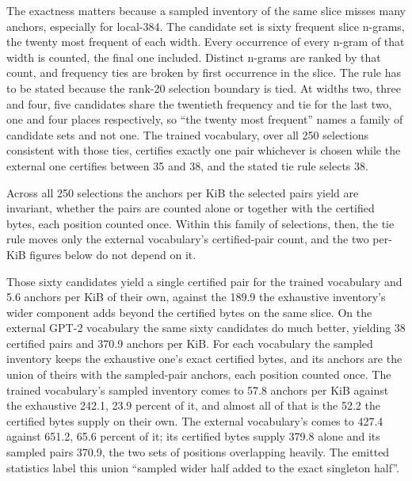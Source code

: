 \documentclass[11pt,a4paper]{article}
\theoremstyle{definition}
\theoremstyle{plain}
\newcommand{\code}[1]{\texttt{#1}}
\begin{document}
\begin{table}[!htbp]
\centering

\caption{Share of each evaluation block's ceiling supply retained by the frozen hybrid inventory, emitted by
\code{frozen\_inventory.py}. The inventory's windows of widths two to four were calibrated on the disjoint slice, and
the upper median over the sixteen blocks follows the zero-based percentile rule stated in the text.}
\label{tab:frozen}
\end{table}

The exactness matters because a sampled inventory of the same slice misses many anchors, especially for local-384. The
candidate set is sixty frequent slice n-grams, the twenty most frequent of each width. Every occurrence of every n-gram
of that width is counted, the final one included. Distinct n-grams are ranked by that count, and frequency ties are
broken by first occurrence in the slice. The rule has to be stated because the rank-20 selection boundary is tied. At
widths two, three and four, five candidates share the twentieth frequency and tie for the last two, one and four places
respectively, so ``the twenty most frequent'' names a family of candidate sets and not one. The trained vocabulary, over
all 250 selections consistent with those ties, certifies exactly one pair whichever is chosen while the external one
certifies between 35 and 38, and the stated tie rule selects 38.

Across all 250 selections the anchors per KiB the selected pairs yield are invariant, whether the pairs are counted
alone or together with the certified bytes, each position counted once. Within this family of selections, then, the tie
rule moves only the external vocabulary's certified-pair count, and the two per-KiB figures below do not depend on it.

Those sixty candidates yield a single certified pair for the trained vocabulary and 5.6 anchors per KiB of their own,
against the 189.9 the exhaustive inventory's wider component adds beyond the certified bytes on the same slice. On the
external GPT-2 vocabulary the same sixty candidates do much better, yielding 38 certified pairs and 370.9 anchors per
KiB. For each vocabulary the sampled inventory keeps the exhaustive one's exact certified bytes, and its anchors are the
union of theirs with the sampled-pair anchors, each position counted once. The trained vocabulary's sampled inventory
comes to 57.8 anchors per KiB against the exhaustive 242.1, 23.9 percent of it, and almost all of that is the 52.2 the
certified bytes supply on their own. The external vocabulary's comes to 427.4 against 651.2, 65.6 percent of it; its
certified bytes supply 379.8 alone and its sampled pairs 370.9, the two sets of positions overlapping heavily. The
emitted statistics label this union ``sampled wider half added to the exact singleton half''.
\end{document}
